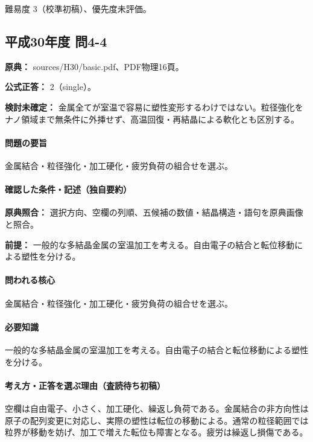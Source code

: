 \par 難易度 3（校準初稿）、優先度未評価。

\subsection{平成30年度 問4-4}
\label{q:h30-reg-basic-4-4}

\noindent\textbf{原典：} sources/H30/basic.pdf、PDF物理16頁。

\textbf{公式正答：} 2（single）。

\par\textbf{検討未確定：} 金属全てが室温で容易に塑性変形するわけではない。粒径強化をナノ領域まで無条件に外挿せず、高温回復・再結晶による軟化とも区別する。

\paragraph{問題の要旨} 金属結合・粒径強化・加工硬化・疲労負荷の組合せを選ぶ。

\paragraph{確認した条件・記述（独自要約）}\mbox{}\par

\noindent\textbf{原典照合：} 選択方向、空欄の列順、五候補の数値・結晶構造・語句を原典画像と照合。\par

\noindent\textbf{前提：} 一般的な多結晶金属の室温加工を考える。自由電子の結合と転位移動による塑性を分ける。\par

\paragraph{問われる核心} 金属結合・粒径強化・加工硬化・疲労負荷の組合せを選ぶ。

\paragraph{必要知識} 一般的な多結晶金属の室温加工を考える。自由電子の結合と転位移動による塑性を分ける。

\paragraph{考え方・正答を選ぶ理由（査読待ち初稿）} 空欄は自由電子、小さく、加工硬化、繰返し負荷である。金属結合の非方向性は原子の配列変更に対応し、実際の塑性は転位の移動による。通常の粒径範囲では粒界が移動を妨げ、加工で増えた転位も障害となる。疲労は繰返し損傷である。

